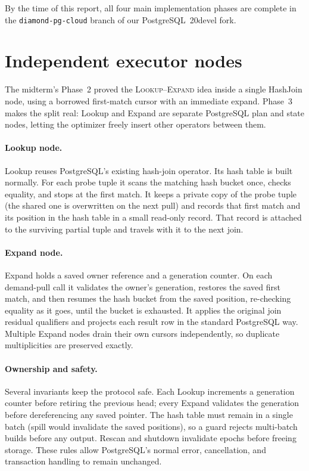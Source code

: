 \documentclass[10pt,twocolumn]{article}
\newcommand{\lookup}{\textsc{Lookup}}
\newcommand{\expand}{\textsc{Expand}}
\newcommand{\code}[1]{{\small\texttt{#1}}}
\begin{document}
By the time of this report, all four main implementation phases are complete
in the \code{diamond-pg-cloud} branch of our PostgreSQL~20devel fork.

\section{Independent executor nodes}

The midterm's Phase~2 proved the \lookup{}--\expand{} idea inside a single
HashJoin node, using a borrowed first-match cursor with an immediate expand.
Phase~3 makes the split real: Lookup and Expand are separate PostgreSQL plan
and state nodes, letting the optimizer freely insert other operators between
them.

\paragraph{Lookup node.}
Lookup reuses PostgreSQL's existing hash-join operator. Its hash table is built
normally. For each probe tuple it scans the matching hash bucket once, checks
equality, and stops at the first match. It keeps a private copy of the probe
tuple (the shared one is overwritten on the next pull) and records that first
match and its position in the hash table in a small read-only record. That
record is attached to the surviving partial tuple and travels with it to the
next join.

\paragraph{Expand node.}
Expand holds a saved owner reference and a generation counter. On each
demand-pull call it validates the owner's generation, restores the saved first
match, and then resumes the hash bucket from the saved position, re-checking
equality as it goes, until the bucket is exhausted. It applies the original
join residual qualifiers and projects each result row in the standard
PostgreSQL way. Multiple Expand nodes drain their own cursors independently,
so duplicate multiplicities are preserved exactly.

\paragraph{Ownership and safety.}
Several invariants keep the protocol safe. Each Lookup increments a generation
counter before retiring the previous head; every Expand validates the
generation before dereferencing any saved pointer. The hash table must remain
in a single batch (spill would invalidate the saved positions), so a guard
rejects multi-batch builds before any output. Rescan and shutdown invalidate
epochs before freeing storage. These rules allow PostgreSQL's normal error,
cancellation, and transaction handling to remain unchanged.
\end{document}
